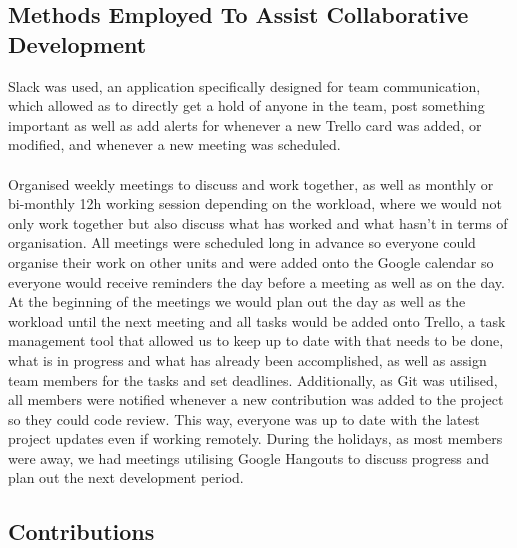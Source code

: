 \documentclass[11pt,a4paper]{article}
\begin{document}
        \subsection{Methods Employed To Assist Collaborative Development}
        Slack was used, an application specifically designed for team communication, which allowed as to directly get a hold of anyone in the team, post something important as well as add alerts for whenever a new Trello card was added, or modified, and whenever a new meeting was scheduled. \\ \\
        Organised weekly meetings to discuss and work together, as well as monthly or bi-monthly 12h working session depending on the workload, where we would not only work together but also discuss what has worked and what hasn’t in terms of organisation. All meetings were scheduled long in advance so everyone could organise their work on other units and were added onto the Google calendar so everyone would receive reminders the day before a meeting as well as on the day.
        At the beginning of the meetings we would plan out the day as well as the workload until the next meeting and all tasks would be added onto Trello, a task management tool that allowed us to keep up to date with that needs to be done, what is in progress and what has already been accomplished, as well as assign team members for the tasks and set deadlines.
        Additionally, as Git was utilised, all members were notified whenever a new contribution was added to the project so they could code review. This way, everyone was up to date with the latest project updates even if working remotely. 
        During the holidays, as most members were away, we had meetings utilising Google Hangouts to discuss progress and plan out the next development period. 

        \pagebreak

        \subsection{Contributions}
\end{document}
